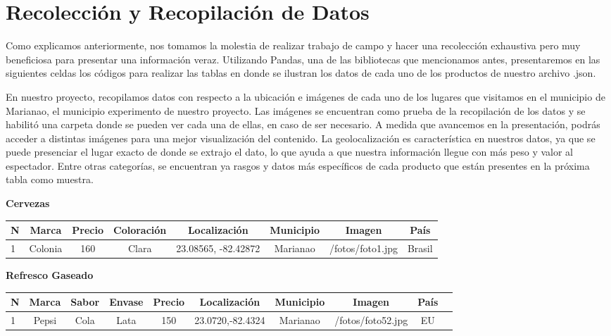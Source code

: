 \documentclass[a4paper,12pt]{article}
\begin{document}
\section{Recolección y Recopilación de Datos}\label{sec:ent}
Como explicamos anteriormente, nos tomamos la molestia de realizar trabajo de campo y hacer una recolección exhaustiva pero muy beneficiosa para presentar una información veraz. 
Utilizando Pandas, una de las bibliotecas que mencionamos antes, presentaremos en las siguientes celdas los códigos para realizar las tablas en donde se ilustran los datos de cada uno de los productos de nuestro archivo .json.

En nuestro proyecto, recopilamos datos con respecto a la ubicación e imágenes de cada uno de los lugares que visitamos en el municipio de Marianao, el municipio experimento de nuestro proyecto. 
Las imágenes se encuentran como prueba de la recopilación de los datos y se habilitó una carpeta donde se pueden ver cada una de ellas, en caso de ser necesario. 
A medida que avancemos en la presentación, podrás acceder a distintas imágenes para una mejor visualización del contenido. 
La geolocalización es característica en nuestros datos, ya que se puede presenciar el lugar exacto de donde se extrajo el dato, lo que ayuda a que nuestra información llegue con más peso y valor al espectador. 
Entre otras categorías, se encuentran ya rasgos y datos más específicos de cada producto que están presentes en la próxima tabla como muestra.
\begin{center}
     \textbf{Cervezas}
    
     \begin{tabular}{|l|c|c|c|c|c|c|c|}
        \hline
        N & Marca & Precio & Coloración & Localización & Municipio & Imagen & País\\
        \hline
        1 & Colonia & 160 & Clara & 23.08565, -82.42872 & Marianao & /fotos/foto1.jpg & Brasil\\
        \hline
    \end{tabular}

    \textbf{Refresco Gaseado}
    \begin{tabular}{|l|c|c|c|c|c|c|c|c|c|}
        \hline
        N & Marca & Sabor & Envase & Precio & Localización & Municipio & Imagen & País\\
        \hline
        1 & Pepsi & Cola & Lata & 150 & 23.0720,-82.4324 & Marianao & /fotos/foto52.jpg& EU\\
        \hline

    \end{tabular}
\end{center}
\end{document}
